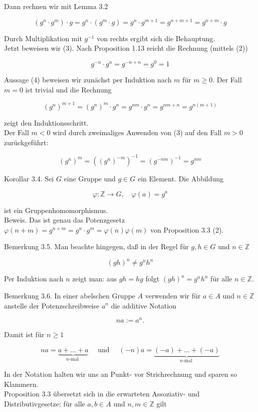 \documentclass[10pt, letterpaper]{article}
\begin{document}
Dann rechnen wir mit Lemma 3.2

$$
\left(g^{n} \cdot g^{m}\right) \cdot g=g^{n} \cdot\left(g^{m} \cdot g\right)=g^{n} \cdot g^{m+1}=g^{n+m+1}=g^{n+m} \cdot g
$$

Durch Multiplikation mit $g^{-1}$ von rechts ergibt sich die Behauptung.\\
Jetzt beweisen wir (3). Nach Proposition 1.13 reicht die Rechnung (mittels (2))

$$
g^{-n} \cdot g^{n}=g^{-n+n}=g^{0}=1
$$

Aussage (4) beweisen wir zunächst per Induktion nach $m$ für $m \geq 0$. Der Fall $m=0$ ist trivial und die Rechnung

$$
\left(g^{n}\right)^{m+1}=\left(g^{n}\right)^{m} \cdot g^{n}=g^{n m} \cdot g^{n}=g^{n m+n}=g^{n(m+1)}
$$

zeigt den Induktionsschritt.\\
Der Fall $m<0$ wird durch zweimaliges Anwenden von (3) auf den Fall $m>0$ zurückgeführt:

$$
\left(g^{n}\right)^{m}=\left(\left(g^{n}\right)^{-m}\right)^{-1}=\left(g^{-n m}\right)^{-1}=g^{n m}
$$

Korollar 3.4. Sei $G$ eine Gruppe und $g \in G$ ein Element. Die Abbildung

$$
\varphi: \mathbb{Z} \rightarrow G, \quad \varphi(a)=g^{a}
$$

ist ein Gruppenhomomorphismus.\\
Beweis. Das ist genau das Potenzgesetz $\varphi(n+m)=g^{n+m}=g^{n} \cdot g^{m}=\varphi(n) \varphi(m)$ von Proposition 3.3 (2).

Bemerkung 3.5. Man beachte hingegen, daß in der Regel für $g, h \in G$ und $n \in \mathbb{Z}$

$$
(g h)^{n} \neq g^{n} h^{n}
$$

Per Induktion nach $n$ zeigt man: aus $g h=h g$ folgt $(g h)^{n}=g^{n} h^{n}$ für alle $n \in \mathbb{Z}$.

Bemerkung 3.6. In einer abelschen Gruppe $A$ verwenden wir für $a \in A$ und $n \in \mathbb{Z}$ anstelle der Potenzschreibweise $a^{n}$ die additive Notation

$$
n a:=a^{n} .
$$

Damit ist für $n \geq 1$

$$
n a=\underbrace{a+\ldots+a}_{n \text {-mal }} \quad \text { und } \quad(-n) a=\underbrace{(-a)+\ldots+(-a)}_{n \text {-mal }}
$$

In der Notation halten wir uns an Punkt- vor Strichrechnung und sparen so Klammern.\\
Proposition 3.3 übersetzt sich in die erwarteten Assoziativ- und Distributivgesetze: für alle $a, b \in A$ und $n, m \in \mathbb{Z}$ gilt
\end{document}
